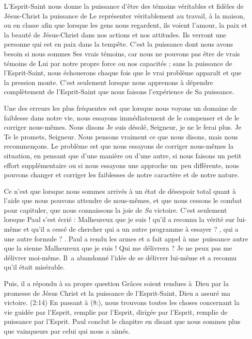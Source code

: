L'Esprit-Saint nous donne la puissance d'être des témoins véritables
 et fidèles de Jésus-Christ \ocadr la puissance de Le représenter
 véritablement au travail, à la maison, ou en classe \fcadr{}
 afin que lorsque les gens nous regardent, ils voient l'amour,
 la paix et la beauté de Jésus-Christ dans nos actions et nos attitudes.
 Ils verront une personne qui est en paix dans la tempête.
 C'est la puissance dont nous avons besoin si nous sommes Ses vrais témoins,
 car nous ne pouvons pas être de vrais témoins de Lui par notre propre force
 ou nos capacités ; sans la puissance de l'Esprit-Saint, nous échouerons
 chaque fois que le vrai problème apparaît et que la pression monte.
 C'est seulement lorsque nous apprenons à dépendre complètement
 de l'Esprit-Saint que nous faisons l'expérience de Sa puissance.

Une des erreurs les plus fréquentes est que lorsque nous voyons un domaine de
 faiblesse dans notre vie, nous essayons immédiatement de le compenser
 et de le corriger nous-mêmes. Nous disons\frcolon{}
 \Og Je suis désolé, Seigneur, je ne le ferai plus.
 Je Te le promets, Seigneur. \Fg{}
 Nous pensons vraiment ce que nous disons, mais nous recommençons.
 Le problème est que nous essayons de corriger nous-mêmes la situation,
 en pensant que d'une manière ou d'une autre, si nous faisons un petit effort
 supplémentaire ou si nous essayons une approche un~peu différente,
 nous pouvons changer et corriger les faiblesses de notre caractère
 et de notre nature.

Ce n'est que lorsque nous sommes arrivés à un état de désespoir total
 quant à l'aide que nous pouvons attendre de nous-mêmes, et que nous cessons le combat
 pour capituler, que nous connaissons la joie de \emph{Sa} victoire.
 C'est seulement lorsque Paul s'est écrié :
 \Og Malheureux que je suis ! \Fg{} qu'il a reconnu la vérité sur lui-même
 et qu'il a cessé de chercher \Og qui a un autre programme à essayer ? \Fg{},
 \Og qui a une autre formule ? \Fg{}.
 Paul a rendu les armes et a fait appel à une~puissance
 autre que la sienne\frcolon{} \Og Malheureux que je suis ! Qui me délivrera ?
 Je ne peux pas me délivrer moi-même. \Fg{}
 Il~a abandonné l'idée de se délivrer lui-même et a reconnu
 qu'il était misérable.

Puis, il a répondu à sa propre question\frcolon{}
 \Og Grâces soient rendues à~Dieu par la promesse de Jésus Christ
 et la puissance de l'Esprit-Saint, Dieu a assuré ma victoire. \Fg{}
 (2:14) En passant à (8:),
 nous trouvons toutes les choses concernant la vie guidée par l'Esprit,
 remplie par l'Esprit, dirigée par l'Esprit, remplie de puissance par l'Esprit.
 Paul conclut le chapitre en disant que nous sommes \Og plus que vainqueurs
 par celui qui nous a aimés. \Fg{}


